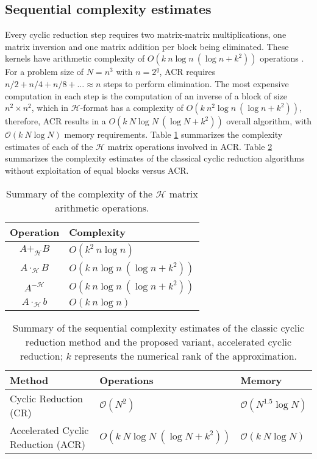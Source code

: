 \documentclass[]{elsarticle}
\begin{document}
\subsection{Sequential complexity estimates}

Every cyclic reduction step requires two matrix-matrix multiplications, one matrix inversion and one matrix addition per block being eliminated. These kernels have arithmetic complexity of $O(k~n \log n~(\log n + k^2))$ operations \cite{hackbusch2015hierarchical}. 
For a problem size of $N = n^3$ with $n = 2^q$, ACR requires $n/2+n/4+n/8+\ldots \approx {n}$ steps to perform elimination. 
The most expensive computation in each step is the computation of an inverse of a block of size $n^2 \times n^2$, which in $\mathcal{H}$-format has a complexity of $O(k~n^2 \log n~(\log n + k^2))$, therefore, ACR results in a $O(k~N \log N~(\log N + k^2))$ overall algorithm, with $\mathcal{O}(k~N \log N)$ memory requirements. Table \ref{arithEstimates} summarizes the complexity estimates of each of the $\mathcal{H}$ matrix operations involved in ACR. Table \ref{complexity} summarizes the complexity estimates of the classical cyclic reduction algorithms without exploitation of equal blocks versus ACR.

\begin{table}[ht!]
\centering
\begin{tabular}{|c|l|}
\hline
Operation & Complexity \\ \hline
$ A +_{\mathcal{H}} B     $ & $O(k^2~n \log n)$  \\ \hline
$ A \cdot_{\mathcal{H}} B $ & $O(k~n \log n~(\log n + k^2))$              \\ \hline
$ A^{-\mathcal{H}}        $ & $O(k~n \log n~(\log n + k^2))$  \\ \hline
$ A \cdot_{\mathcal{H}} b $ & $O(k~n \log n) $              \\ \hline
\end{tabular}
\caption{Summary of the complexity of the $\mathcal{H}$ matrix arithmetic operations.}
\label{arithEstimates}
\end{table}

\begin{table}[H]
\centering
\begin{tabular}{l|l|l}
Method							& Operations 					& Memory \\ \hline
Cyclic Reduction (CR) 				& $\mathcal{O}(N^2)$ 			& $\mathcal{O}(N^{1.5} \log N)$ \\
Accelerated Cyclic Reduction (ACR)    & $O(k~N \log N~(\log N + k^2))$ 	& $\mathcal{O}(k~N \log N)$ \\
\end{tabular}
\caption{Summary of the sequential complexity estimates of the classic cyclic reduction method and the proposed variant, accelerated cyclic reduction; $k$ represents the numerical rank of the approximation.}
\label{complexity}
\end{table}
\end{document}

